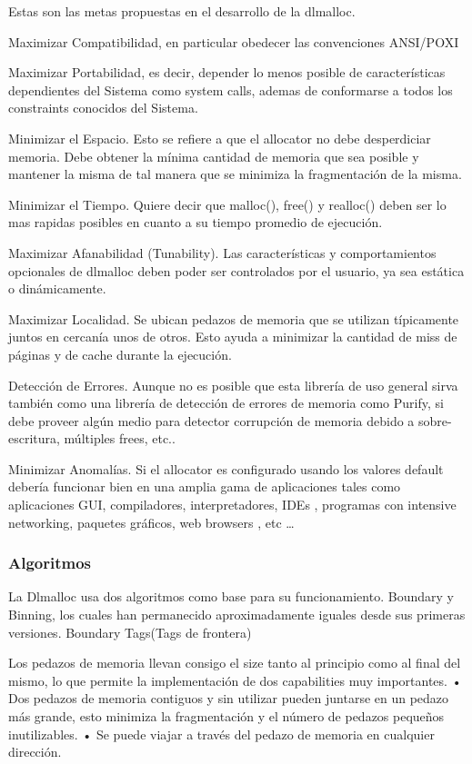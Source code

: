 \documentclass[11pt]{article} %
\begin{document}
Estas son las metas propuestas en el desarrollo de la dlmalloc.

Maximizar Compatibilidad, en particular obedecer las convenciones ANSI/POXI

Maximizar Portabilidad, es decir, depender lo menos posible de características dependientes del Sistema como system calls, ademas de conformarse a todos los constraints conocidos del Sistema.

Minimizar el Espacio. Esto se refiere a que el allocator no debe desperdiciar memoria. Debe obtener la mínima cantidad de memoria que sea posible y mantener la misma de tal manera que se minimiza la fragmentación de la misma.

Minimizar el Tiempo. Quiere decir que malloc(), free() y realloc() deben ser lo mas rapidas posibles en cuanto a su tiempo promedio de ejecución.

Maximizar Afanabilidad (Tunability). Las características y comportamientos opcionales de dlmalloc deben poder ser controlados por el usuario, ya sea estática o dinámicamente.

Maximizar Localidad. Se ubican pedazos de memoria que se utilizan típicamente juntos en cercanía unos de otros. Esto ayuda a minimizar la cantidad de miss de páginas y de cache durante la ejecución.




Detección de Errores. Aunque no es posible que esta librería de uso general sirva también como una librería de detección de errores de memoria como Purify, si debe proveer algún medio para detector corrupción de memoria debido a sobre-escritura, múltiples frees, etc..

Minimizar Anomalías. Si el allocator es configurado usando los valores default debería funcionar bien en una amplia gama de aplicaciones tales como aplicaciones GUI, compiladores, interpretadores, IDEs , programas con intensive networking, paquetes gráficos, web browsers , etc …

\subsubsection{Algoritmos}

La Dlmalloc usa dos algoritmos como base para su funcionamiento. Boundary y Binning, los cuales han permanecido aproximadamente iguales desde sus primeras versiones.
Boundary Tags(Tags de frontera)

Los pedazos de memoria llevan consigo el size tanto al principio como al final del mismo, lo que permite la implementación de dos capabilities muy importantes.
•	Dos pedazos de memoria contiguos y sin utilizar pueden juntarse en un pedazo más grande, esto minimiza la fragmentación y el número de pedazos pequeños inutilizables.
•	Se puede viajar a través del pedazo de memoria en cualquier dirección.
\end{document}
